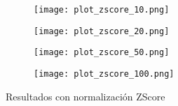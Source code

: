 \documentclass{article}
\begin{document}

\begin{figure}[hbt!]

\begin{subfigure}{.475\linewidth}
    \texttt{[image: plot\_zscore\_10.png]}
    \caption{}
\end{subfigure}
\begin{subfigure}{.475\linewidth}
    \texttt{[image: plot\_zscore\_20.png]}
    \caption{}
\end{subfigure}

\medskip
\begin{subfigure}{.475\linewidth}
    \texttt{[image: plot\_zscore\_50.png]}
    \caption{}
\end{subfigure}
\begin{subfigure}{.475\linewidth}
    \texttt{[image: plot\_zscore\_100.png]}
    \caption{}
\end{subfigure}

\caption{Resultados con normalización ZScore}
\end{figure}
\end{document}
